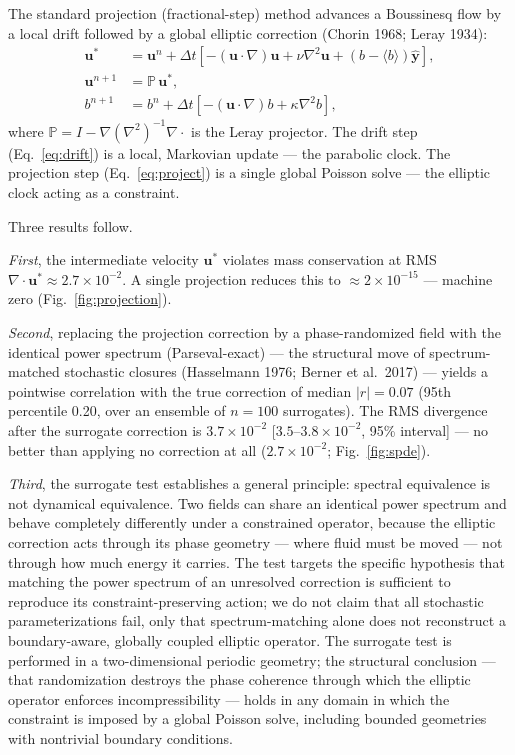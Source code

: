 \documentclass[11pt]{article}
\begin{document}
The standard projection (fractional-step) method advances a Boussinesq flow by a
local drift followed by a global elliptic correction (Chorin 1968; Leray 1934):
\begin{align}
\mathbf{u}^* &= \mathbf{u}^n + \Delta t\left[
-(\mathbf{u}\cdot\nabla)\mathbf{u} + \nu\nabla^2\mathbf{u}
+ (b - \langle b\rangle)\hat{\mathbf{y}}\right],
\label{eq:drift}\\
\mathbf{u}^{n+1} &= \mathbb{P}\,\mathbf{u}^*,
\label{eq:project}\\
b^{n+1} &= b^n + \Delta t\left[
-(\mathbf{u}\cdot\nabla)b + \kappa\nabla^2 b\right],
\label{eq:scalar_step}
\end{align}
where $\mathbb{P} = I - \nabla(\nabla^2)^{-1}\nabla\cdot$ is the Leray projector.
The drift step (Eq.~\ref{eq:drift}) is a local, Markovian update --- the parabolic
clock. The projection step (Eq.~\ref{eq:project}) is a single global Poisson solve
--- the elliptic clock acting as a constraint.

Three results follow.

\emph{First}, the intermediate velocity $\mathbf{u}^*$ violates mass conservation
at RMS $\nabla\cdot\mathbf{u}^* \approx 2.7\times 10^{-2}$. A single projection
reduces this to $\approx 2\times 10^{-15}$ --- machine zero
(Fig.~\ref{fig:projection}).

\emph{Second}, replacing the projection correction by a phase-randomized field
with the identical power spectrum (Parseval-exact) --- the structural move of
spectrum-matched stochastic closures (Hasselmann 1976; Berner et al.\ 2017) ---
yields a pointwise correlation with the true correction of median $|r| = 0.07$
(95th percentile 0.20, over an ensemble of $n = 100$ surrogates). The RMS
divergence after the surrogate correction is $3.7\times 10^{-2}$
[$3.5$--$3.8\times 10^{-2}$, 95\% interval] --- no better than applying no
correction at all ($2.7\times 10^{-2}$; Fig.~\ref{fig:spde}).

\emph{Third}, the surrogate test establishes a general principle: spectral
equivalence is not dynamical equivalence. Two fields can share an identical
power spectrum and behave completely differently under a constrained operator,
because the elliptic correction acts through its phase geometry --- where fluid
must be moved --- not through how much energy it carries. The test targets the
specific hypothesis that matching the power spectrum of an unresolved correction
is sufficient to reproduce its constraint-preserving action; we do not claim that
all stochastic parameterizations fail, only that spectrum-matching alone does not
reconstruct a boundary-aware, globally coupled elliptic operator. The surrogate
test is performed in a two-dimensional periodic geometry; the structural
conclusion --- that randomization destroys the phase coherence through which the
elliptic operator enforces incompressibility --- holds in any domain in which the
constraint is imposed by a global Poisson solve, including bounded geometries
with nontrivial boundary conditions.
\end{document}
